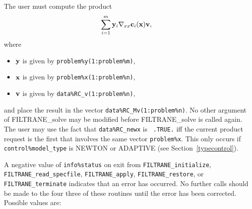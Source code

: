 \documentclass{galahad}
\newcommand{\packagename}{FILTRANE}
\newcommand{\sym}{\sf\small}
\begin{document}
\begin{description}
 The user must compute the product
\[
     \sum_{i=1}^m {\mathbf{y}}_i \nabla_{xx} {\mathbf{c}}_i( {\mathbf{x}} ) {\mathbf{v}},
\]
where 
\begin{itemize}
\item ${\mathbf{y}}$ is given by {\tt problem\%y(1:problem\%m)},
\item ${\mathbf{x}}$ is given by {\tt problem\%x(1:problem\%n)},
\item ${\mathbf{v}}$ is given by {\tt data\%RC\_v(1:problem\%n)},
\end{itemize}
and place the result in the vector {\tt data\%RC\_Mv(1:problem\%n)}. No other
argument of \packagename\_solve may be modified before \packagename\_solve 
is called again. The user may use the fact that {\tt data\%RC\_newx} is {\tt
.TRUE.} iff the current product request is the first that involves the same
vector {\tt problem\%x}. This only occurs if {\tt control\%model\_type} is
{\sym NEWTON} or {\sym ADAPTIVE}
(see Section~\ref{typecontrol}).
\end{description} 


\galerrors
A negative value of {\tt info\%status} on exit from 
{\tt \packagename\_initialize},
{\tt \packagename\_read\_specfile},
{\tt \packagename\_apply},
{\tt \packagename\_restore},
or 
{\tt \packagename\_terminate}
indicates that an error has occurred. No further calls should be made
to the four three of these routines until the error has been
corrected. Possible values are:
\end{document}
